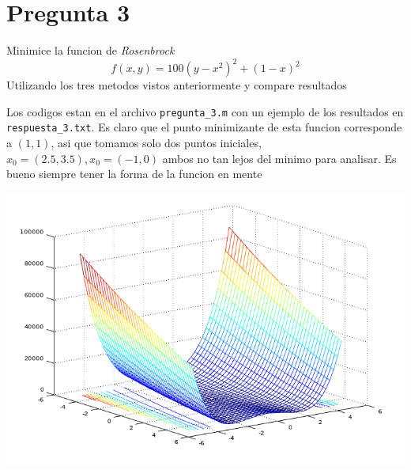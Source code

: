 \documentclass[letterpaper]{article}
\begin{document}
\section*{Pregunta 3}
\noindent Minimice la funcion de \emph{Rosenbrock}
\[ f(x,y) = 100 (y - x^2)^2 + (1 - x)^2 \]
Utilizando los tres metodos vistos anteriormente y compare resultados
\newline

Los codigos estan en el archivo \texttt{pregunta\_3.m} con un ejemplo de
los resultados en \texttt{respuesta\_3.txt}. Es claro que el punto
minimizante de esta funcion corresponde a \((1,1)\), asi que tomamos solo
dos puntos iniciales, \(x_0 = (2.5, 3.5), x_0 = (-1,0) \) ambos no tan
lejos del minimo para analisar. Es bueno siempre tener la forma de la
funcion en mente
\begin{center}
  \includegraphics[scale=0.6]{pregunta3.png}
\end{center}
\end{document}
